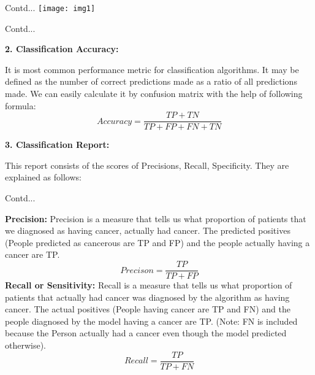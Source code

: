 \documentclass{beamer}
\newcommand\myheading[1]{%
  \par\bigskip
  {\large\bfseries#1}\par\smallskip}
\begin{document}
\begin{frame}{Contd...}
	\texttt{[image: img1]}
\end{frame}

\begin{frame}{Contd...}
	\begin{flushleft}
		\myheading{2. Classification Accuracy:}
		It is most common performance metric for classification algorithms. It may be defined as the number of correct predictions made as a ratio of all predictions made. We can easily calculate it by confusion matrix with the help of following formula:\\
		\begin{equation*}
			Accuracy = \frac{TP + TN}{TP + FP + FN + TN}
		\end{equation*}
		\myheading{3. Classification Report:}
		This report consists of the scores of Precisions, Recall, Specificity. They are explained as follows:
	\end{flushleft}
\end{frame}

\begin{frame}{Contd...}
\begin{flushleft}
	\textbf{Precision:} Precision is a measure that tells us what proportion of patients that we diagnosed as having cancer, actually had cancer. The predicted positives (People predicted as cancerous are TP and FP) and the people actually having a cancer are TP.
	\begin{equation*}
		Precison = \frac{TP}{TP + FP}
	\end{equation*}
	\textbf{Recall or Sensitivity:} Recall is a measure that tells us what proportion of patients that actually had cancer was diagnosed by the algorithm as having cancer. The actual positives (People having cancer are TP and FN) and the people diagnosed by the model having a cancer are TP. (Note: FN is included because the Person actually had a cancer even though the model predicted otherwise).
	\begin{equation*}
		Recall = \frac{TP}{TP + FN}
	\end{equation*}
\end{flushleft}
\end{frame}
\end{document}
